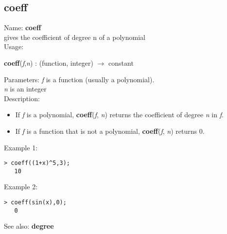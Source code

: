 \subsection{ coeff }
\noindent Name: \textbf{coeff}\\
gives the coefficient of degree n of a polynomial\\

\noindent Usage: 
\begin{center}
\textbf{coeff}(\emph{f},\emph{n}) : (\textsf{function}, \textsf{integer}) $\rightarrow$ \textsf{constant}\\
\end{center}
Parameters: 
\emph{f} is a function (usually a polynomial).\\
\emph{n} is an integer\\

\noindent Description: \begin{itemize}

\item If \emph{f} is a polynomial, \textbf{coeff}(\emph{f}, \emph{n}) returns the coefficient of
   degree \emph{n} in \emph{f}.

\item If \emph{f} is a function that is not a polynomial, \textbf{coeff}(\emph{f}, \emph{n}) returns 0.
\end{itemize}
\noindent Example 1: 
\begin{center}\begin{minipage}{14.8cm}\begin{Verbatim}[frame=single]
   > coeff((1+x)^5,3);
   10
\end{Verbatim}
\end{minipage}\end{center}
\noindent Example 2: 
\begin{center}\begin{minipage}{14.8cm}\begin{Verbatim}[frame=single]
   > coeff(sin(x),0);
   0
\end{Verbatim}
\end{minipage}\end{center}
See also: \textbf{degree}
